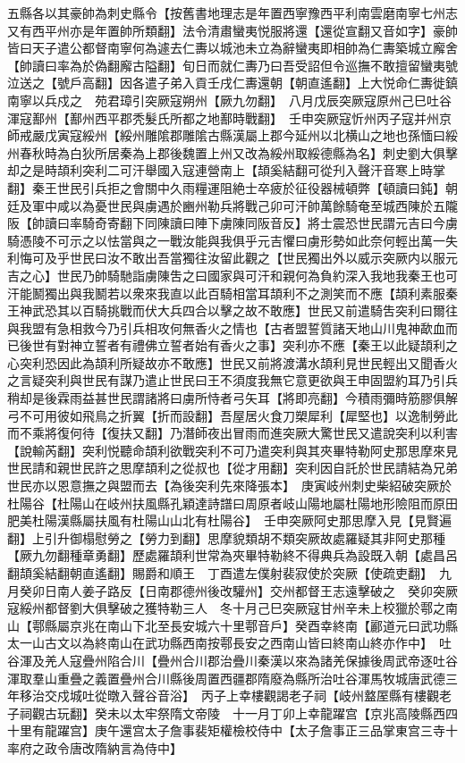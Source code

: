 五縣各以其豪帥為刺史縣令【按舊書地理志是年置西寧豫西平利南雲磨南寧七州志又有西平州亦是年置帥所類翻】法令清肅蠻夷悦服將還【還從宣翻又音如字】豪帥皆曰天子遣公都督南寧何為遽去仁夀以城池未立為辭蠻夷即相帥為仁夀築城立廨舍【帥讀曰率為於偽翻廨古隘翻】旬日而就仁夀乃曰吾受詔但令巡撫不敢擅留蠻夷號泣送之【號戶高翻】因各遣子弟入貢壬戌仁夀還朝【朝直遙翻】上大悦命仁夀徙鎮南寧以兵戍之　苑君璋引突厥寇朔州【厥九勿翻】　八月戊辰突厥寇原州己巳吐谷渾寇鄯州【鄯州西平郡秃髮氏所都之地鄯時戰翻】　壬申突厥寇忻州丙子寇并州京師戒嚴戊寅寇綏州【綏州雕隂郡雕隂古縣漢屬上郡今延州以北横山之地也孫愐曰綏州春秋時為白狄所居秦為上郡後魏置上州又改為綏州取綏德縣為名】刺史劉大俱擊却之是時頡利突利二可汗舉國入寇連營南上【頡奚結翻可從刋入聲汗音寒上時掌翻】秦王世民引兵拒之會關中久雨糧運阻絶士卒疲於征役器械頓弊【頓讀曰鈍】朝廷及軍中咸以為憂世民與虜遇於豳州勒兵將戰己卯可汗帥萬餘騎奄至城西陳於五隴阪【帥讀曰率騎奇寄翻下同陳讀曰陣下虜陳同阪音反】將士震恐世民謂元吉曰今虜騎憑陵不可示之以怯當與之一戰汝能與我俱乎元吉懼曰虜形勢如此奈何輕出萬一失利悔可及乎世民曰汝不敢出吾當獨往汝留此觀之【世民獨出外以威示突厥内以服元吉之心】世民乃帥騎馳詣虜陳吿之曰國家與可汗和親何為負約深入我地我秦王也可汗能鬭獨出與我鬭若以衆來我直以此百騎相當耳頡利不之測笑而不應【頡利素服秦王神武恐其以百騎挑戰而伏大兵四合以擊之故不敢應】世民又前遣騎吿突利曰爾往與我盟有急相救今乃引兵相攻何無香火之情也【古者盟誓質諸天地山川鬼神歃血而已後世有對神立誓者有禮佛立誓者始有香火之事】突利亦不應【秦王以此疑頡利之心突利恐因此為頡利所疑故亦不敢應】世民又前將渡溝水頡利見世民輕出又聞香火之言疑突利與世民有謀乃遣止世民曰王不須度我無它意更欲與王申固盟約耳乃引兵稍却是後霖雨益甚世民謂諸將曰虜所恃者弓矢耳【將即亮翻】今積雨彌時筋膠俱解弓不可用彼如飛鳥之折翼【折而設翻】吾屋居火食刀槊犀利【犀堅也】以逸制勞此而不乘將復何待【復扶又翻】乃潛師夜出冒雨而進突厥大驚世民又遣說突利以利害【說輸芮翻】突利悦聽命頡利欲戰突利不可乃遣突利與其夾畢特勒阿史那思摩來見世民請和親世民許之思摩頡利之從叔也【從才用翻】突利因自託於世民請結為兄弟世民亦以恩意撫之與盟而去【為後突利先來降張本】　庚寅岐州刺史柴紹破突厥於杜陽谷【杜陽山在岐州扶風縣孔穎達詩譜曰周原者岐山陽地屬杜陽地形險阻而原田肥美杜陽漢縣屬扶風有杜陽山山北有杜陽谷】　壬申突厥阿史那思摩入見【見賢遍翻】上引升御榻慰勞之【勞力到翻】思摩貌類胡不類突厥故處羅疑其非阿史那種【厥九勿翻種章勇翻】歷處羅頡利世常為夾畢特勒終不得典兵為設既入朝【處昌呂翻頡奚結翻朝直遙翻】賜爵和順王　丁酉遣左僕射裴寂使於突厥【使疏吏翻】　九月癸卯日南人姜子路反【日南郡德州後改驩州】交州都督王志遠擊破之　癸卯突厥寇綏州都督劉大俱擊破之獲特勒三人　冬十月己巳突厥寇甘州辛未上校獵於鄠之南山【鄠縣屬京兆在南山下北至長安城六十里鄠音戶】癸酉幸終南【酈道元曰武功縣太一山古文以為終南山在武功縣西南按鄠長安之西南山皆曰終南山終亦作中】　吐谷渾及羌人寇疊州陷合川【疊州合川郡治疊川秦漢以來為諸羌保據後周武帝逐吐谷渾取羣山重疊之義置疊州合川縣後周置西疆郡隋廢為縣所治吐谷渾馬牧城唐武德三年移治交戍城吐從暾入聲谷音浴】　丙子上幸樓觀謁老子祠【岐州盩厔縣有樓觀老子祠觀古玩翻】癸未以太牢祭隋文帝陵　十一月丁卯上幸龍躍宫【京兆高陵縣西四十里有龍躍宫】庚午還宫太子詹事裴矩權檢校侍中【太子詹事正三品掌東宫三寺十率府之政令唐改隋納言為侍中】

